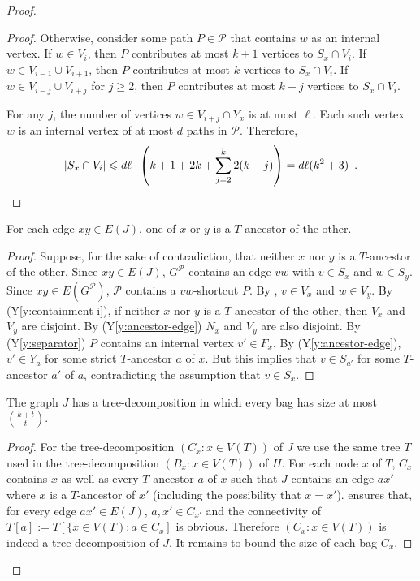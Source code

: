 \documentclass{patmorin}
\newcommand{\yref}[1]{(Y\ref{y:#1})}
\renewcommand{\ge}{\geqslant}
\renewcommand{\le}{\leqslant}
\begin{document}
\begin{proof}
\begin{proof}
  Otherwise, consider some path $P\in\mathcal{P}$ that contains $w$ as an internal vertex.  If $w\in V_{i}$, then $P$ contributes at most $k+1$ vertices to $S_x\cap V_i$.  If $w\in V_{i-1}\cup V_{i+1}$, then $P$ contributes at most $k$ vertices to $S_x\cap V_i$. If $w\in V_{i-j}\cup V_{i+j}$ for $j\ge 2$, then $P$ contributes at most $k-j$ vertices to $S_x\cap V_i$.
  
  For any $j$, the number of vertices $w\in V_{i+j}\cap Y_x$ is at most $\ell$. Each such vertex $w$ is an internal vertex of at most $d$ paths in $\mathcal{P}$. Therefore, 
  \[  |S_x\cap V_i|\le d\ell\cdot\left(k+1 + 2k + \sum_{j=2}^k 2(k-j)\right) %
      = d\ell(k^2 +3) \enspace . \qedhere
  \]
\end{proof}

\begin{clm}
  For each edge $xy\in E(J)$, one of $x$ or $y$ is a $T$-ancestor of the other.
\end{clm}

\begin{proof}
  Suppose, for the sake of contradiction, that neither $x$ nor $y$ is a $T$-ancestor of the other.  Since $xy\in E(J)$, $G^\mathcal{P}$ contains an edge $vw$ with $v\in S_x$ and $w\in S_y$.  Since $xy\in E(G^{\mathcal{P}})$,  $\mathcal{P}$ contains a $vw$-shortcut $P$.  By , $v\in V_x$ and $w\in V_y$.  By \yref{containment-i}, if neither $x$ nor $y$ is a $T$-ancestor of the other, then $V_x$ and $V_y$ are disjoint.  By \yref{ancestor-edge} $N_x$ and $V_y$ are also disjoint.  By \yref{separator} $P$ contains an internal vertex $v'\in F_x$.  By \yref{ancestor-edge}, $v'\in Y_a$ for some strict $T$-ancestor $a$ of $x$.  But this implies that $v\in S_{a'}$ for some $T$-ancestor $a'$ of $a$, contradicting the assumption that $v\in S_x$.
\end{proof}

\begin{clm}
  The graph $J$ has a tree-decomposition in which every bag has size at most $\binom{k+t}{t}$.
\end{clm}

\begin{proof}
  For the tree-decomposition $(C_x:x\in V(T))$ of $J$ we use the same tree $T$ used in the tree-decomposition $(B_x:x\in V(T))$ of $H$. For each node $x$ of $T$, $C_x$ contains $x$ as well as every $T$-ancestor $a$ of $x$ such that $J$ contains an edge $ax'$ where $x$ is a $T$-ancestor of $x'$ (including the possibility that $x=x'$).
   ensures that, for every edge $ax'\in E(J)$, $a,x'\in C_{x'}$ and the connectivity of $T[a]:=T[\{x\in V(T):a\in C_x]$ is obvious.  Therefore $(C_x:x\in V(T))$ is indeed a tree-decomposition of $J$.  It remains to bound the size of each bag $C_x$. 
  

\end{proof}
\end{proof}
\end{document}
